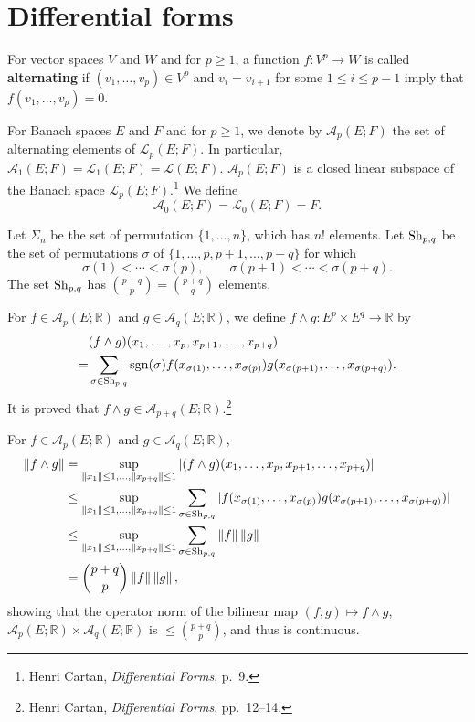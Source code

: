 \documentclass{article}
\newcommand{\Sh}{\ensuremath\mathrm{Sh}}
\newcommand{\sgn}{\ensuremath\mathrm{sgn}}
\newcommand{\norm}[1]{\left\Vert #1 \right\Vert}
\theoremstyle{definition}
\begin{document}
\section{Differential forms}
For vector spaces $V$ and $W$ and for $p \geq 1$, a function $f:V^p \to W$ is called
\textbf{alternating} if 
$(v_1,\ldots,v_p) \in V^p$ and
$v_i=v_{i+1}$ for some $1 \leq i \leq p-1$ 
imply that $f(v_1,\ldots,v_p)=0$.

For Banach spaces $E$ and $F$ and for $p \geq 1$,
we denote by $\mathscr{A}_p(E;F)$ the set of alternating elements of
$\mathscr{L}_p(E;F)$. In particular, $\mathscr{A}_1(E;F)=\mathscr{L}_1(E;F)=
\mathscr{L}(E;F)$. $\mathscr{A}_p(E;F)$ is a closed linear subspace
of the Banach space $\mathscr{L}_p(E;F)$.\footnote{Henri Cartan,
{\em Differential Forms}, p.~9.}
We define
\[
\mathscr{A}_0(E;F)=\mathscr{L}_0(E;F)=F.
\] 

Let $\Sigma_n$ be the set of permutation $\{1,\ldots,n\}$, which has $n!$ elements.
Let $\Sh_{p,q}$ be the set of permutations $\sigma$ of $\{1,\ldots,p,p+1,\ldots,p+q\}$ for which
\[
\sigma(1)<\cdots<\sigma(p), \qquad \sigma(p+1)<\cdots<\sigma(p+q).
\]
The set $\Sh_{p,q}$ has $\binom{p+q}{p}=\binom{p+q}{q}$ elements. 

For $f \in \mathscr{A}_p(E;\mathbb{R})$ and $g \in \mathscr{A}_q(E;\mathbb{R})$,
we define $f \wedge g:E^p \times E^q \to \mathbb{R}$ by
\[
\begin{split}
&(f \wedge g)(x_1,\ldots,x_p,x_{p+1},\ldots,x_{p+q})\\
=&\sum_{\sigma \in \Sh_{p,q}} \sgn(\sigma) f(x_{\sigma(1)},\ldots,x_{\sigma(p)})
g(x_{\sigma(p+1)},\ldots,x_{\sigma(p+q)}).
\end{split}
\]
It is proved that $f \wedge g \in \mathscr{A}_{p+q}(E;\mathbb{R})$.\footnote{Henri Cartan,
{\em Differential Forms}, pp.~12--14.}

For $f \in \mathscr{A}_p(E;\mathbb{R})$ and
$g \in \mathscr{A}_q(E;\mathbb{R})$,
\begin{align*}
\norm{f \wedge g}&=\sup_{\norm{x_1} \leq 1,\ldots, \norm{x_{p+q}} \leq 1}
|(f \wedge g)(x_1,\ldots,x_p,x_{p+1},\ldots,x_{p+q})|\\
&\leq \sup_{\norm{x_1} \leq 1,\ldots, 
\norm{x_{p+q}} \leq 1}
\sum_{\sigma \in \Sh_{p,q}} |f(x_{\sigma(1)},\ldots,x_{\sigma(p)})
g(x_{\sigma(p+1)},\ldots,x_{\sigma(p+q)})|\\
&\leq  \sup_{\norm{x_1} \leq 1,\ldots, \norm{x_{p+q}} \leq 1}
\sum_{\sigma \in \Sh_{p,q}} \norm{f} \norm{g}\\
&=\binom{p+q}{p} \norm{f} \norm{g},
\end{align*}
showing that the operator norm of the bilinear map $(f,g) \mapsto f \wedge g$,
$\mathscr{A}_p(E;\mathbb{R}) \times \mathscr{A}_q(E;\mathbb{R})$ is
$\leq \binom{p+q}{p}$, and thus is continuous.
\end{document}
